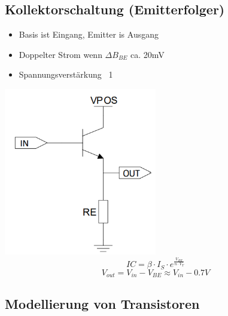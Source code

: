 \documentclass[margin=normal]{tex/hsrzf}
\begin{document}
\begin{minipage}{0.5\textwidth}
  \subsection{Kollektorschaltung (Emitterfolger)}
  \begin{itemize}[leftmargin=*]
    \item Basis ist Eingang, Emitter is Ausgang
    \item Doppelter Strom wenn $\Delta B_{BE}$ ca. 20mV
    \item Spannungsverstärkung ~1
  \end{itemize}
  \includegraphics[width = 0.5\textwidth]{img/Transistor/Emitterschaltung2.png} %
  $$IC = \beta \cdot I_S \cdot e^{\frac{V_{BE}}{n \cdot V_T}}$$
  $$V_{out} = V_{in} - V_{BE} \approx V_{in} - 0.7V$$
\end{minipage}%

\subsection*{Modellierung von Transistoren}
\end{document}
